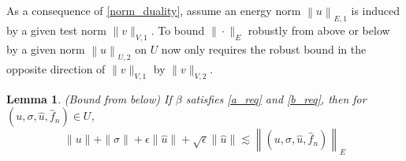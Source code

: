 \documentclass[11pt,onecolumn]{scrartcl}
\newtheorem{lemma}{Lemma}
\begin{document}
As a consequence of \eqref{norm_duality}, assume an energy norm $\left\| u \right\|_{E,1}$ is induced by a given test norm $\| v  \|_{V,1}$.  To bound $\|\cdot\|_E$ robustly from above or below by a given norm $\left\| u \right\|_{U,2}$ on $U$ now only requires the robust bound in the opposite direction of $\| v \|_{V,1}$ by $\|v\|_{V,2}$. 

\begin{lemma}
\label{bound_from_below}
(Bound from below) If $\beta$ satisfies \eqref{a_req} and \eqref{b_req}, then for $\left(u,\sigma,\widehat{u},\widehat{f}_n\right) \in U$,
\[
\|u\| + \|\sigma\| + \epsilon\|\widehat{u}\|+ \sqrt{\epsilon}\|\widehat{u}\| \lesssim \left\|\left(u,\sigma,\widehat{u},\widehat{f}_n\right)\right\|_E
\]
\end{lemma}
\end{document}
